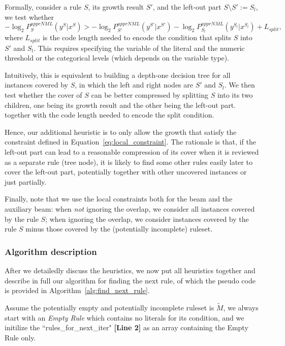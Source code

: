Formally, consider a rule $S$, its growth result $S'$, and the left-out part $S \setminus S' := S_l$, we test whether 
\begin{equation} \label{eq:local_constraint}
	-\log_2 P_S^{apprNML}(y^S|x^S) > -\log_2 P_{S'}^{apprNML}(y^{S'}|x^{S'}) - \log_2 P_{S_l}^{apprNML}(y^{S_l}|x^{S_l}) + L_{split}, 
\end{equation}
where $L_{split}$ is the code length needed to encode the condition that splits $S$ into $S'$ and $S_l$. This requires specifying the variable of the literal and the numeric threshold or the categorical levels (which depends on the variable type). 

Intuitively, this is equivalent to building a depth-one decision tree for all instances covered by $S$, in which the left and right nodes are $S'$ and $S_l$. We then test whether the cover of $S$ can be better compressed by splitting $S$ into its two children, one being its growth result and the other being the left-out part. together with the code length needed to encode the split condition. 

Hence, our additional heuristic is to only allow the growth that satisfy the constraint defined in Equation~\ref{eq:local_constraint}. The rationale is that, if the left-out part can lead to a reasonable compression of its cover when it is reviewed as a separate rule (tree node), it is likely to find some other rules easily later to cover the left-out part, potentially together with other uncovered instances or just partially. 

Finally, note that we use the local constraints both for the beam and the auxiliary beam: when \emph{not} ignoring the overlap, we consider all instances covered by the rule $S$; when ignoring the overlap, we consider instances covered by the rule $S$ minus those covered by the (potentially incomplete) ruleset. 

 

\subsubsection{Algorithm description}
 After we detailedly discuss the heuristics, we now put all heuristics together and describe in full our algorithm for finding the next rule, of which the pseudo code is provided in Algorithm~\ref{alg:find_next_rule}. 

Assume the potentially empty and potentially incomplete ruleset is $\tilde{M}$, we always start with an \emph{Empty Rule} which contains no literals for its condition, and we initilize the ``rules\_for\_next\_iter" \textbf{[Line 2]} as an array containing the Empty Rule only. 

